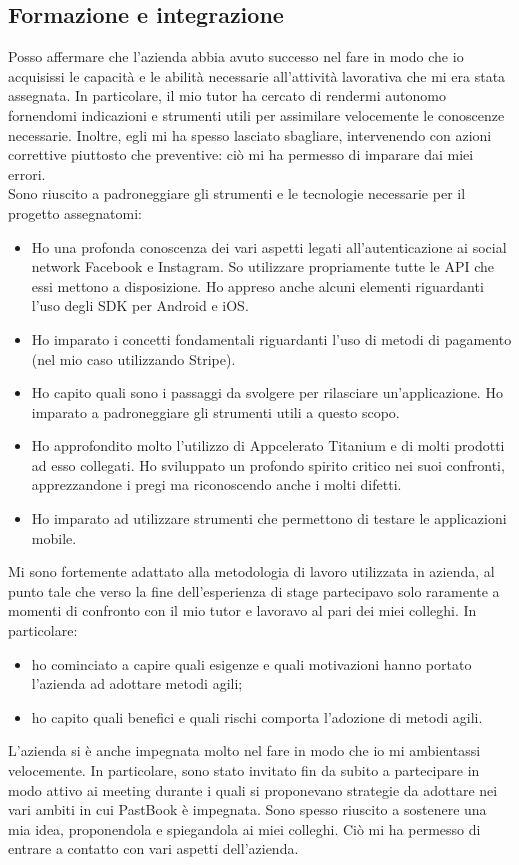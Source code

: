 		\subsection{Formazione e integrazione}
			Posso affermare che l'azienda abbia avuto successo nel fare in modo che io acquisissi le capacità e le abilità necessarie
			all'attività lavorativa che mi era stata assegnata. In particolare, il mio tutor ha cercato di rendermi autonomo fornendomi
			indicazioni e strumenti utili per assimilare velocemente le conoscenze necessarie. Inoltre, egli mi ha spesso lasciato
			sbagliare, intervenendo con azioni correttive piuttosto che preventive: ciò mi ha permesso di imparare dai miei errori.\\
			Sono riuscito a padroneggiare gli strumenti e le tecnologie necessarie per il progetto assegnatomi:
			\begin{itemize}
				\item Ho una profonda conoscenza dei vari aspetti legati all'autenticazione ai social network Facebook e Instagram.
				So utilizzare propriamente tutte le API che essi mettono a disposizione. Ho appreso anche alcuni elementi
				riguardanti l'uso degli SDK per Android e iOS.
				\item Ho imparato i concetti fondamentali riguardanti l'uso di metodi di pagamento (nel mio caso utilizzando Stripe).
				\item Ho capito quali sono i passaggi da svolgere per rilasciare un'applicazione. Ho imparato a padroneggiare gli
				strumenti utili a questo scopo.
				\item Ho approfondito molto l'utilizzo di Appcelerato Titanium e di molti prodotti ad esso collegati. Ho sviluppato
				un profondo spirito critico nei suoi confronti, apprezzandone i pregi ma riconoscendo anche i molti difetti.
				\item Ho imparato ad utilizzare strumenti che permettono di testare le applicazioni mobile.
			\end{itemize}
			Mi sono fortemente adattato alla metodologia di	lavoro utilizzata in azienda, al punto tale che verso la fine
			dell'esperienza di stage partecipavo solo raramente a momenti di confronto con il mio tutor e lavoravo al pari dei miei
			colleghi. In particolare:
			\begin{itemize}
				\item ho cominciato a capire quali esigenze e quali motivazioni hanno portato l'azienda ad adottare metodi agili;
				\item ho capito quali benefici e quali rischi comporta l'adozione di metodi agili.
			\end{itemize}
			L'azienda si è anche impegnata molto nel fare in modo che io mi ambientassi velocemente. In particolare, sono stato invitato
			fin da subito a partecipare in modo attivo ai meeting durante i quali si proponevano strategie da adottare nei vari ambiti
			in cui PastBook è impegnata. Sono spesso riuscito a sostenere una mia idea, proponendola e spiegandola ai miei colleghi. Ciò
			mi ha permesso di entrare a contatto con vari aspetti dell'azienda.
